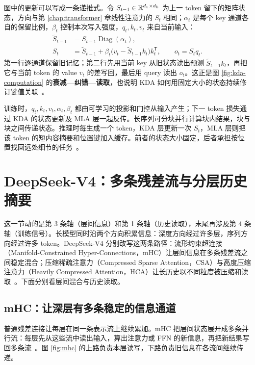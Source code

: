 图中的更新可以写成一条递推式。令 \(S_{t-1}\in\mathbb{R}^{d_v\times d_k}\) 为上一 token 留下的矩阵状态，方向与第 \ref{chap:transformer} 章线性注意力的 \(S_t\) 相同；\(\alpha_t\) 是每个 key 通道各自的保留比例，\(\beta_t\) 控制本次写入强度，\(q_t,k_t,v_t\) 来自当前输入：
\begin{equation}
\begin{aligned}
\widetilde S_{t-1}&=S_{t-1}\operatorname{Diag}(\alpha_t),\\
S_t&=\widetilde S_{t-1}+\beta_t\bigl(v_t-\widetilde S_{t-1}k_t\bigr)k_t^{\mathsf T},\qquad o_t=S_tq_t.
\end{aligned}
\label{eq:kda-update}
\end{equation}
第一行逐通道保留旧记忆；第二行先用当前 key 从旧状态读出预测 \(\widetilde S_{t-1}k_t\)，再把它与当前 token 的 value \(v_t\) 的差写回，最后用 query 读出 \(o_t\)。这正是图 \ref{fig:kda-computation} 的\textbf{衰减—纠错—读取}，也说明 KDA 如何用固定大小的状态持续修订键值关联~\cite{kimilinear}。

训练时，\(q_t,k_t,v_t,\alpha_t,\beta_t\) 都由可学习的投影和门控从输入产生；下一 token 损失通过 KDA 的状态更新及 MLA 层一起反传。长序列可分块并行计算块内结果，块与块之间传递状态。推理时每生成一个 token，KDA 层更新一次 \(S_t\)，MLA 层则把该 token 的短内容摘要和位置键加入缓存。前者的状态大小固定，后者承担按位置找回远处细节的任务~\cite{kimilinear}。


\section{DeepSeek-V4：多条残差流与分层历史摘要}

这一节动的是第 3 条轴（层间信息）和第 1 条轴（历史读取），末尾再涉及第 4 条轴（训练信号）。长模型同时沿两个方向积累信息：深度方向经过许多层，序列方向经过许多 token。DeepSeek-V4 分别改写这两条路径：流形约束超连接（Manifold-Constrained Hyper-Connections，mHC）让层间信息在多条残差流之间稳定混合；压缩稀疏注意力（Compressed Sparse Attention，CSA）与高度压缩注意力（Heavily Compressed Attention，HCA）让长历史以不同粒度被压缩和读取~\cite{deepseekv4}。下面分别看层间混合与历史读取。

\subsection{mHC：让深层有多条稳定的信息通道}

普通残差连接让每层在同一条表示流上继续累加。mHC 把层间状态展开成多条并行流：每层先从这些流中读出输入，算出注意力或 FFN 的新信息，再把新结果写回多条流~\cite{deepseekv4,mhc}。图 \ref{fig:mhc} 的上路负责本层读写，下路负责旧信息在各流间继续传递。

